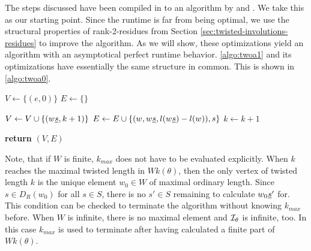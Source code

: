 The steps discussed have been compiled in to an algorithm by \cite[Algorithm 2.4]{brennemann:twoa} and \cite[Algorithm 3.1.1]{haas:twoa}. We take this as our starting point. Since the runtime is far from being optimal, we use the structural properties of rank-2-residues from Section \ref{sec:twisted-involutions-residues} to improve the algorithm. As we will show, these optimizations yield an algorithm with an asymptotical perfect runtime behavior. \ref{algo:twoa1} and its optimizations have essentially the same structure in common. This is shown in \ref{algo:twoa0}.

\begin{algo}[TWOABase]
	\hfill
	\begin{algorithmic}[1]
	\State $V \gets \{(e,0)\}$
	\State $E \gets \{\}$

	 \label{algo:twoa0-k-loop}
		 \label{algo:twoa0-v-loop}
			 \label{algo:twoa0-s-loop} 
				 \label{algo:twoa0-decision} 
					\State $V \gets V \cup \{ (w \underline{s},k+1) \}$
				\EndIf
				\State $E \gets E \cup \{ (w,w \underline{s},l(w \underline{s}) - l(w)),s \}$
			\EndFor
		\EndFor
		\State $k \gets k + 1$
	\EndFor

	\State \textbf{return} $(V,E)$
	\EndProcedure
	\end{algorithmic}
\end{algo}

\begin{rema}
	Note, that if $W$ is finite, $k_{max}$ does not have to be evaluated explicitly. When $k$ reaches the maximal twisted length in $Wk(\theta)$, then the only vertex of twisted length $k$ is the unique element $w_0 \in W$ of maximal ordinary length. Since $s \in D_R(w_0)$ for all $s \in S$, there is no $s' \in S$ remaining to calculate $w_0 \underline{s}'$ for. This condition can be checked to terminate the algorithm without knowing $k_{max}$ before. When $W$ is infinite, there is no maximal element and $\mathcal{I}_{\theta}$ is infinite, too. In this case $k_{max}$ is used to terminate after having calculated a finite part of $Wk(\theta)$.
\end{rema}

